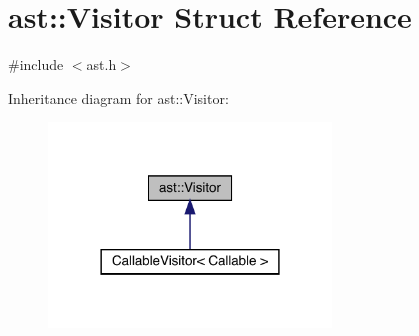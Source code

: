 \hypertarget{structast_1_1_visitor}{}\section{ast\+:\+:Visitor Struct Reference}
\label{structast_1_1_visitor}


{\ttfamily \#include $<$ast.\+h$>$}



Inheritance diagram for ast\+:\+:Visitor\+:
\nopagebreak
\begin{figure}[H]
\begin{center}
\leavevmode
\includegraphics[width=213pt]{structast_1_1_visitor__inherit__graph}
\end{center}
\end{figure}
